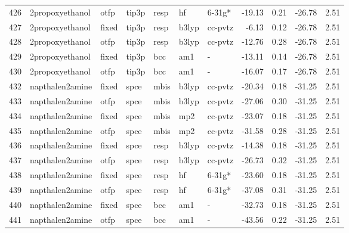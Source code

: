 \begin{tabular}{lllllllrrrr}
426 &               2propoxyethanol &   otfp &  tip3p &   resp &      hf &       6-31g* &      -19.13 &     0.21 &      -26.78 &      2.51 \\
427 &               2propoxyethanol &  fixed &  tip3p &   resp &   b3lyp &      cc-pvtz &       -6.13 &     0.12 &      -26.78 &      2.51 \\
428 &               2propoxyethanol &   otfp &  tip3p &   resp &   b3lyp &      cc-pvtz &      -12.76 &     0.28 &      -26.78 &      2.51 \\
429 &               2propoxyethanol &  fixed &  tip3p &    bcc &     am1 &            - &      -13.11 &     0.14 &      -26.78 &      2.51 \\
430 &               2propoxyethanol &   otfp &  tip3p &    bcc &     am1 &            - &      -16.07 &     0.17 &      -26.78 &      2.51 \\
432 &               napthalen2amine &  fixed &   spce &   mbis &   b3lyp &      cc-pvtz &      -20.34 &     0.18 &      -31.25 &      2.51 \\
433 &               napthalen2amine &   otfp &   spce &   mbis &   b3lyp &      cc-pvtz &      -27.06 &     0.30 &      -31.25 &      2.51 \\
434 &               napthalen2amine &  fixed &   spce &   mbis &     mp2 &      cc-pvtz &      -23.07 &     0.18 &      -31.25 &      2.51 \\
435 &               napthalen2amine &   otfp &   spce &   mbis &     mp2 &      cc-pvtz &      -31.58 &     0.28 &      -31.25 &      2.51 \\
436 &               napthalen2amine &  fixed &   spce &   resp &   b3lyp &      cc-pvtz &      -14.38 &     0.18 &      -31.25 &      2.51 \\
437 &               napthalen2amine &   otfp &   spce &   resp &   b3lyp &      cc-pvtz &      -26.73 &     0.32 &      -31.25 &      2.51 \\
438 &               napthalen2amine &  fixed &   spce &   resp &      hf &       6-31g* &      -23.60 &     0.18 &      -31.25 &      2.51 \\
439 &               napthalen2amine &   otfp &   spce &   resp &      hf &       6-31g* &      -37.08 &     0.31 &      -31.25 &      2.51 \\
440 &               napthalen2amine &  fixed &   spce &    bcc &     am1 &            - &      -32.73 &     0.18 &      -31.25 &      2.51 \\
441 &               napthalen2amine &   otfp &   spce &    bcc &     am1 &            - &      -43.56 &     0.22 &      -31.25 &      2.51 \\

\end{tabular}
